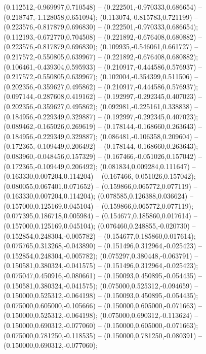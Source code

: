  (0.112512,-0.969997,0.710548) -- (0.222501,-0.970333,0.686654) -- (0.218747,-1.128058,0.651094);
 (0.113074,-0.815783,0.721199) -- (0.223576,-0.817879,0.696830) -- (0.222501,-0.970333,0.686654);
 (0.112193,-0.672770,0.704508) -- (0.221892,-0.676408,0.680882) -- (0.223576,-0.817879,0.696830);
 (0.109935,-0.546061,0.661727) -- (0.217572,-0.550805,0.639967) -- (0.221892,-0.676408,0.680882);
 (0.106461,-0.439304,0.595933) -- (0.210917,-0.444586,0.576937) -- (0.217572,-0.550805,0.639967);
 (0.102004,-0.354399,0.511506) -- (0.202356,-0.359627,0.495862) -- (0.210917,-0.444586,0.576937);
 (0.097144,-0.287608,0.419162) -- (0.192997,-0.292345,0.407023) -- (0.202356,-0.359627,0.495862);
 (0.092981,-0.225161,0.338838) -- (0.184956,-0.229349,0.329887) -- (0.192997,-0.292345,0.407023);
 (0.089462,-0.165026,0.269619) -- (0.178144,-0.168660,0.263643) -- (0.184956,-0.229349,0.329887);
 (0.086481,-0.106358,0.209604) -- (0.172365,-0.109449,0.206492) -- (0.178144,-0.168660,0.263643);
 (0.083960,-0.048456,0.157329) -- (0.167466,-0.051026,0.157042) -- (0.172365,-0.109449,0.206492);
 (0.081834,0.009284,0.111647) -- (0.163330,0.007204,0.114204) -- (0.167466,-0.051026,0.157042);
 (0.080055,0.067401,0.071652) -- (0.159866,0.065772,0.077119) -- (0.163330,0.007204,0.114204);
 (0.078585,0.126388,0.036624) -- (0.157000,0.125169,0.045104) -- (0.159866,0.065772,0.077119);
 (0.077395,0.186718,0.005984) -- (0.154677,0.185860,0.017614) -- (0.157000,0.125169,0.045104);
 (0.076460,0.248855,-0.020730) -- (0.152854,0.248304,-0.005782) -- (0.154677,0.185860,0.017614);
 (0.075765,0.313268,-0.043890) -- (0.151496,0.312964,-0.025423) -- (0.152854,0.248304,-0.005782);
 (0.075297,0.380448,-0.063791) -- (0.150581,0.380324,-0.041575) -- (0.151496,0.312964,-0.025423);
 (0.075047,0.450916,-0.080661) -- (0.150093,0.450895,-0.054435) -- (0.150581,0.380324,-0.041575);
 (0.075000,0.525312,-0.094659) -- (0.150000,0.525312,-0.064198) -- (0.150093,0.450895,-0.054435);
 (0.075000,0.605000,-0.105666) -- (0.150000,0.605000,-0.071663) -- (0.150000,0.525312,-0.064198);
 (0.075000,0.690312,-0.113624) -- (0.150000,0.690312,-0.077060) -- (0.150000,0.605000,-0.071663);
 (0.075000,0.781250,-0.118535) -- (0.150000,0.781250,-0.080391) -- (0.150000,0.690312,-0.077060);
